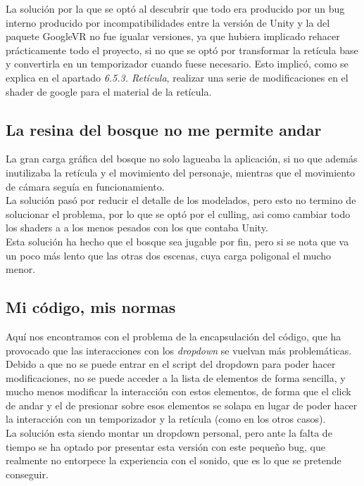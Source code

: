 \quad La solución por la que se optó al descubrir que todo era producido por un bug interno producido por incompatibilidades entre la versión de Unity y la del paquete GoogleVR no fue igualar versiones, ya que hubiera implicado rehacer prácticamente todo el proyecto, si no que se optó por transformar la retícula base y convertirla en un temporizador cuando fuese necesario. Esto implicó, como se explica en el apartado \textit{6.5.3. Retícula}, realizar una serie de modificaciones en el shader de google para el material de la retícula.\\

\subsection{La resina del bosque no me permite andar}

\quad La gran carga gráfica del bosque no solo lagueaba la aplicación, si no que además inutilizaba la retícula y el movimiento del personaje, mientras que el movimiento de cámara seguía en funcionamiento.\\

\quad La solución pasó por reducir el detalle de los modelados, pero esto no termino de solucionar el problema, por lo que se optó por el culling, asi como cambiar todo los shaders a a los menos pesados con los que contaba Unity.\\

\quad Esta solución ha hecho que el bosque sea jugable por fin, pero si se nota que va un poco más lento que las otras dos escenas, cuya carga poligonal el mucho menor.\\

\subsection{Mi código, mis normas}

\quad Aquí nos encontramos con el problema de la encapsulación del código, que ha provocado que las interacciones con los \textit{dropdown} se vuelvan más problemáticas.\\

\quad Debido a que no se puede entrar en el script del dropdown para poder hacer modificaciones, no se puede acceder a la lista de elementos de forma sencilla, y mucho menos modificar la interacción con estos elementos, de forma que el click de andar y el de presionar sobre esos elementos se solapa en lugar de poder hacer la interacción con un temporizador y la retícula (como en los otros casos).\\

\quad La solución esta siendo montar un dropdown personal, pero ante la falta de tiempo se ha optado por presentar esta versión con este pequeño bug, que realmente no entorpece la experiencia con el sonido, que es lo que se pretende conseguir.\\

\newpage





